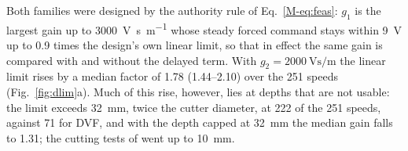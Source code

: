 Both families were designed by the authority rule of Eq.~\eqref{M-eq:feas}: $g_1$ is the largest gain up to \SI{3000}{\volt\second\per\metre} whose steady forced command stays within \SI{9}{\volt} up to 0.9 times the design's own linear limit, so that in effect the same gain is compared with and without the delayed term. With $g_2=\SI{2000}{\volt\second\per\metre}$ the linear limit rises by a median factor of 1.78 (1.44--2.10) over the 251 speeds (Fig.~\ref{fig:dlim}a). Much of this rise, however, lies at depths that are not usable: the limit exceeds \SI{32}{\milli\metre}, twice the cutter diameter, at 222 of the 251 speeds, against 71 for DVF, and with the depth capped at \SI{32}{\milli\metre} the median gain falls to 1.31; the cutting tests of \citet{ozsoy2026robust} went up to \SI{10}{\milli\metre}.


